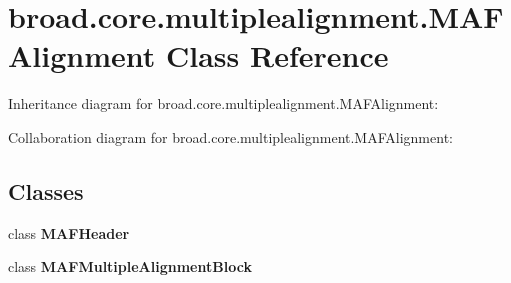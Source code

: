 \hypertarget{classbroad_1_1core_1_1multiplealignment_1_1_m_a_f_alignment}{\section{broad.\+core.\+multiplealignment.\+M\+A\+F\+Alignment Class Reference}
\label{classbroad_1_1core_1_1multiplealignment_1_1_m_a_f_alignment}
}


Inheritance diagram for broad.\+core.\+multiplealignment.\+M\+A\+F\+Alignment\+:


Collaboration diagram for broad.\+core.\+multiplealignment.\+M\+A\+F\+Alignment\+:
\subsection*{Classes}
\begin{DoxyCompactItemize}
\item 
class {\bfseries M\+A\+F\+Header}
\item 
class {\bfseries M\+A\+F\+Multiple\+Alignment\+Block}
\end{DoxyCompactItemize}
